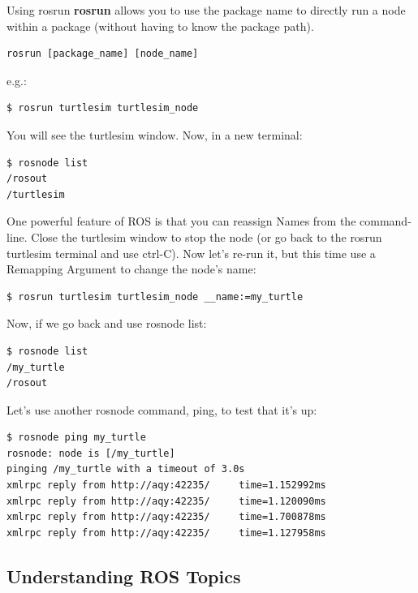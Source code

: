 \begin{frame}{Using rosrun}
\textbf{rosrun} allows you to use the package name to directly run a node within a package (without having to know the package path). 
\begin{lstlisting}[language=syntax]
rosrun [package_name] [node_name]
\end{lstlisting}
e.g.:
\begin{lstlisting}[language=shell]
$ rosrun turtlesim turtlesim_node
\end{lstlisting}
You will see the turtlesim window. Now, in a new terminal:
\begin{lstlisting}[language=shell]
$ rosnode list
/rosout
/turtlesim
\end{lstlisting}
One powerful feature of ROS is that you can reassign Names from the command-line. Close the turtlesim window to stop the node (or go back to the rosrun turtlesim terminal and use ctrl-C). Now let's re-run it, but this time use a Remapping Argument to change the node's name: 
\begin{lstlisting}[language=shell]
$ rosrun turtlesim turtlesim_node __name:=my_turtle
\end{lstlisting}
Now, if we go back and use rosnode list:
\begin{lstlisting}[language=shell]
$ rosnode list
/my_turtle
/rosout
\end{lstlisting}
Let's use another rosnode command, ping, to test that it's up: 
\begin{lstlisting}[language=shell]
$ rosnode ping my_turtle
rosnode: node is [/my_turtle]
pinging /my_turtle with a timeout of 3.0s
xmlrpc reply from http://aqy:42235/     time=1.152992ms
xmlrpc reply from http://aqy:42235/     time=1.120090ms
xmlrpc reply from http://aqy:42235/     time=1.700878ms
xmlrpc reply from http://aqy:42235/     time=1.127958ms
\end{lstlisting}
\end{frame}

\subsection{Understanding ROS Topics}


